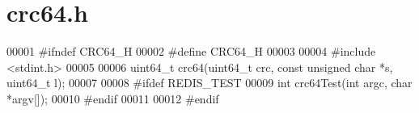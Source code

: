 \hypertarget{crc64_8h_source}{}\section{crc64.\+h}
\label{crc64_8h_source}

\begin{DoxyCode}
00001 \textcolor{preprocessor}{#}\textcolor{preprocessor}{ifndef} \textcolor{preprocessor}{CRC64\_H}
00002 \textcolor{preprocessor}{#}\textcolor{preprocessor}{define} \textcolor{preprocessor}{CRC64\_H}
00003 
00004 \textcolor{preprocessor}{#}\textcolor{preprocessor}{include} \textcolor{preprocessor}{<}\textcolor{preprocessor}{stdint}\textcolor{preprocessor}{.}\textcolor{preprocessor}{h}\textcolor{preprocessor}{>}
00005 
00006 uint64\_t crc64(uint64\_t crc, \textcolor{keyword}{const} \textcolor{keywordtype}{unsigned} \textcolor{keywordtype}{char} *s, uint64\_t l);
00007 
00008 \textcolor{preprocessor}{#}\textcolor{preprocessor}{ifdef} \textcolor{preprocessor}{REDIS\_TEST}
00009 \textcolor{keywordtype}{int} crc64Test(\textcolor{keywordtype}{int} argc, \textcolor{keywordtype}{char} *argv[]);
00010 \textcolor{preprocessor}{#}\textcolor{preprocessor}{endif}
00011 
00012 \textcolor{preprocessor}{#}\textcolor{preprocessor}{endif}
\end{DoxyCode}
